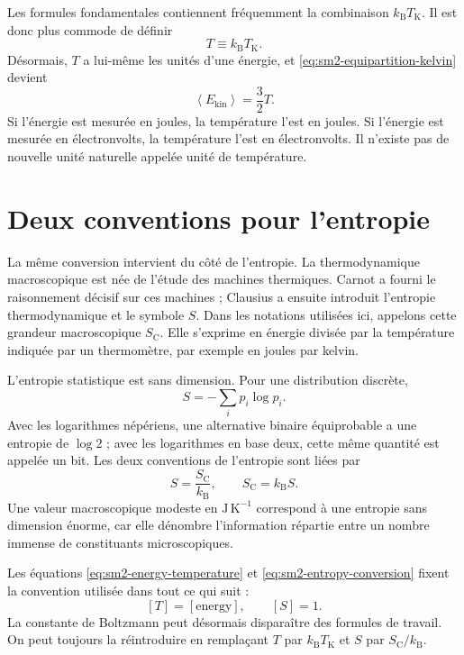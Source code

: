 Les formules fondamentales contiennent fréquemment la combinaison \(k_{\mathrm B}T_{\mathrm K}\). Il est donc plus commode de définir
\begin{equation}
 T\equiv k_{\mathrm B}T_{\mathrm K}.
 \label{eq:sm2-energy-temperature}
\end{equation}
Désormais, \(T\) a lui-même les unités d’une énergie, et
\eqref{eq:sm2-equipartition-kelvin} devient
\begin{equation}
 \left\langle E_{\mathrm{kin}}\right\rangle=\frac{3}{2}T.
 \label{eq:sm2-equipartition-natural}
\end{equation}
Si l’énergie est mesurée en joules, la température l’est en joules. Si l’énergie est mesurée en électronvolts, la température l’est en électronvolts. Il n’existe pas de nouvelle unité naturelle appelée unité de température.

\section{Deux conventions pour l’entropie}

La même conversion intervient du côté de l’entropie. La thermodynamique macroscopique est née de l’étude des machines thermiques. Carnot a fourni le raisonnement décisif sur ces machines ; Clausius a ensuite introduit l’entropie thermodynamique et le symbole \(S\). Dans les notations utilisées ici, appelons cette grandeur macroscopique \(S_{\mathrm C}\). Elle s’exprime en énergie divisée par la température indiquée par un thermomètre, par exemple en joules par kelvin.

L’entropie statistique est sans dimension. Pour une distribution discrète,
\begin{equation}
 S=-\sum_i p_i\log p_i.
 \label{eq:sm2-statistical-entropy}
\end{equation}
Avec les logarithmes népériens, une alternative binaire équiprobable a une entropie de \(\log2\) ; avec les logarithmes en base deux, cette même quantité est appelée un bit. Les deux conventions de l’entropie sont liées par
\begin{equation}
 S=\frac{S_{\mathrm C}}{k_{\mathrm B}},
 \qquad
 S_{\mathrm C}=k_{\mathrm B}S.
 \label{eq:sm2-entropy-conversion}
\end{equation}
Une valeur macroscopique modeste en \(\mathrm{J\,K^{-1}}\) correspond à une entropie sans dimension énorme, car elle dénombre l’information répartie entre un nombre immense de constituants microscopiques.

Les équations \eqref{eq:sm2-energy-temperature} et
\eqref{eq:sm2-entropy-conversion} fixent la convention utilisée dans tout ce qui suit :
\[
 [T]=[\text{energy}],
 \qquad
 [S]=1.
\]
La constante de Boltzmann peut désormais disparaître des formules de travail. On peut toujours la réintroduire en remplaçant \(T\) par \(k_{\mathrm B}T_{\mathrm K}\) et \(S\) par \(S_{\mathrm C}/k_{\mathrm B}\).

